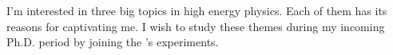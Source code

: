 I'm interested in three big topics in high energy physics. Each of them has its reasons for captivating me. I wish to study these themes during my incoming Ph.D. period by joining the \univ's experiments.

\susyucsb

\leptonucsb

\bphysicsucsb